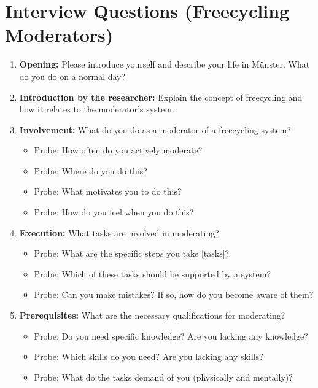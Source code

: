 \section{Interview Questions (Freecycling Moderators)}
\label{app:interview-questions-moderators}

\begin{enumerate}
    \item \textbf{Opening:} Please introduce yourself and describe your life in Münster. What do you do on a normal day?\par\par
    
    \item \textbf{Introduction by the researcher:} Explain the concept of freecycling and how it relates to the moderator’s system.

    \item \textbf{Involvement:} What do you do as a moderator of a freecycling system?

    \begin{itemize}
        \item Probe: How often do you actively moderate?
        \item Probe: Where do you do this?
        \item Probe: What motivates you to do this?
        \item Probe: How do you feel when you do this?
    \end{itemize}

    \item \textbf{Execution:} What tasks are involved in moderating?

    \begin{itemize}
        \item Probe: What are the specific steps you take [tasks]?
        \item Probe: Which of these tasks should be supported by a system?
        \item Probe: Can you make mistakes? If so, how do you become aware of them?
    \end{itemize}

    \item \textbf{Prerequisites:} What are the necessary qualifications for moderating?

    \begin{itemize}
        \item Probe: Do you need specific knowledge? Are you lacking any knowledge?
        \item Probe: Which skills do you need? Are you lacking any skills?
        \item Probe: What do the tasks demand of you (physically and mentally)?
    \end{itemize}


\end{enumerate}
